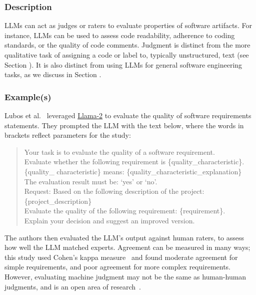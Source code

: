 \subsubsection{Description}

LLMs can act as judges or raters to evaluate properties of software artifacts.
For instance, LLMs can be used to assess code readability, adherence to coding standards, or the quality of code comments.
Judgment is distinct from the more qualitative task of assigning a code or label to, typically unstructured, text (see Section \annotators).
It is also distinct from using LLMs for general software engineering tasks, as we discuss in Section \llmsforresearcher.

\subsubsection{Example(s)}

Lubos et al.~\cite{DBLP:conf/re/LubosFTGMEL24} leveraged \href{https://www.llama.com/llama2/}{Llama-2} to evaluate the quality of software requirements statements. 
They prompted the LLM with the text below, where the words in brackets reflect parameters for the study:

\begin{quote}
Your task is to evaluate the quality of a software requirement.\\
Evaluate whether the following requirement is \{quality\_characteristic\}. \\
\{quality\_ characteristic\} means: \{quality\_characteristic\_explanation\}\\
The evaluation result must be: `yes' or `no'.\\
Request: Based on the following description of the project:
\{project\_description\}\\
Evaluate the quality of the following requirement: \{requirement\}.\\
Explain your decision and suggest an improved version.\\
\end{quote}

The authors then evaluated the LLM's output against human raters, to assess how well the LLM matched experts. 
Agreement can be measured in many ways; this study used Cohen's kappa measure~\cite{cohen60} and found moderate agreement for simple requirements, and poor agreement for more complex requirements.
However, evaluating machine judgment may not be the same as human-human judgments, and is an open area of research~\cite{DBLP:journals/corr/abs-2410-03775}. 

